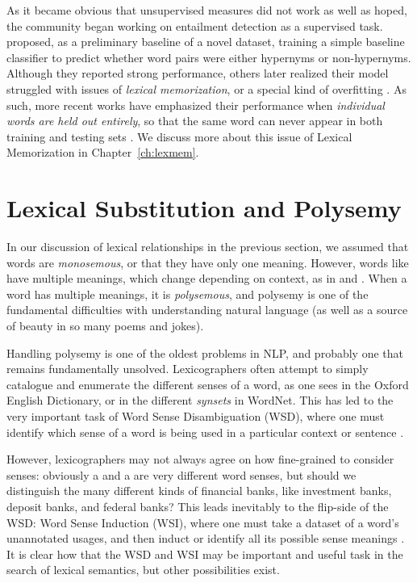 As it became obvious that unsupervised measures did not work as
well as hoped, the community began working on entailment detection as a
supervised task.  proposed, as a preliminary baseline
of a novel dataset, training a simple baseline classifier to predict whether
word pairs were either hypernyms or non-hypernyms. Although they reported strong performance,
others later realized their model struggled with issues of {\em lexical
memorization}, or a special kind of overfitting
\cite{roller:2014:coling,weeds:2014:coling,levy:2015:naacl}. As such, more
recent works have emphasized their performance when {\em individual words are
held out entirely}, so that the same word can never appear in both training and
testing sets
\cite{roller:2014:coling,kruszewski:2015:tacl,levy:2015:naacl,shwartz:2016:acl,roller:2016:naacl}.
We discuss more about this issue of Lexical Memorization in
Chapter~\ref{ch:lexmem}.

\section{Lexical Substitution and Polysemy}
\label{sec:lexsub}

In our discussion of lexical relationships in the previous section, we assumed
that words are {\em monosemous}, or that they have only one meaning. However,
words like  have multiple meanings, which change depending on
context, as in  and . When a word has
multiple meanings, it is {\em polysemous}, and polysemy is one of the
fundamental difficulties with understanding natural language (as well as a
source of beauty in so many poems and jokes).

Handling polysemy is one of the oldest problems in NLP, and probably one that
remains fundamentally unsolved. Lexicographers often attempt to simply
catalogue and enumerate the different senses of a word, as one sees in the
Oxford English Dictionary, or in the different {\em synsets} in WordNet.
This has led to the very important task of Word Sense Disambiguation (WSD),
where one must identify which sense of a word is being used in a particular
context or sentence \cite{mccarthy:2009:llc,navigli:2009:csur}.

However, lexicographers may not always agree on how fine-grained to consider
senses: obviously a  and a  are very
different word senses, but should we distinguish the many different kinds of
financial banks, like investment banks, deposit banks, and federal banks?
This leads inevitably to the flip-side of the WSD: Word Sense Induction
(WSI), where one must take a dataset of a word's unannotated usages, and then
induct or identify all its possible sense meanings
\cite{mccarthy:2009:llc,navigli:2009:csur}.  It is clear how that the WSD and
WSI may be important and useful task in the search of lexical semantics, but
other possibilities exist.

